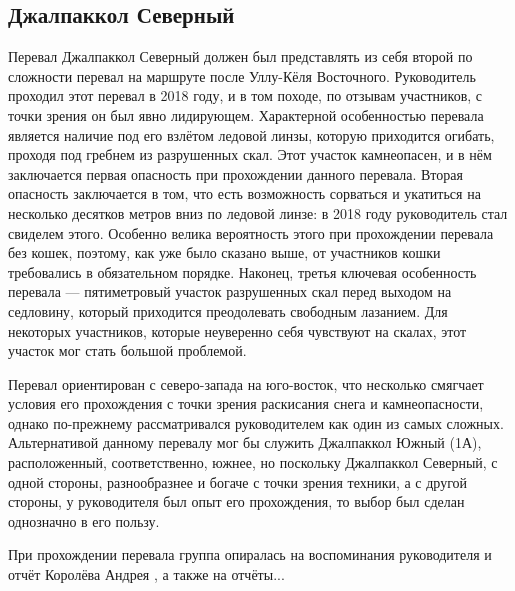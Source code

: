 \subsection{Джалпаккол Северный} 
Перевал Джалпаккол Северный должен был представлять из себя второй по сложности перевал на маршруте после Уллу-Кёля Восточного. Руководитель проходил этот перевал в 2018 году, и в том походе, по отзывам участников, с точки зрения он был явно лидирующем. Характерной особенностью перевала является наличие под его взлётом ледовой линзы, которую приходится огибать, проходя под гребнем из разрушенных скал. Этот участок камнеопасен, и в нём заключается первая опасность при прохождении данного перевала. Вторая опасность заключается в том, что есть возможность сорваться и укатиться на несколько десятков метров вниз по ледовой линзе: в 2018 году руководитель стал свиделем этого. Особенно велика вероятность этого при прохождении перевала без кошек, поэтому, как уже было сказано выше, от участников кошки требовались в обязательном порядке. Наконец, третья ключевая особенность перевала --- пятиметровый участок разрушенных скал перед выходом на седловину, который приходится преодолевать свободным лазанием. Для некоторых участников, которые неуверенно себя чувствуют на скалах, этот участок мог стать большой проблемой. 

Перевал ориентирован с северо-запада на юго-восток, что несколько смягчает условия его прохождения с точки зрения раскисания снега и камнеопасности, однако по-прежнему рассматривался руководителем как один из самых сложных. Альтернативой данному перевалу мог бы служить Джалпаккол Южный (1А), расположенный, соответственно, южнее, но поскольку Джалпаккол Северный, с одной стороны, разнообразнее и богаче с точки зрения техники, а с другой стороны, у руководителя был опыт его прохождения, то выбор был сделан однозначно в его пользу. 

При прохождении перевала группа опиралась на воспоминания руководителя и отчёт Королёва Андрея \cite{Korolyov2018}, а также на отчёты...